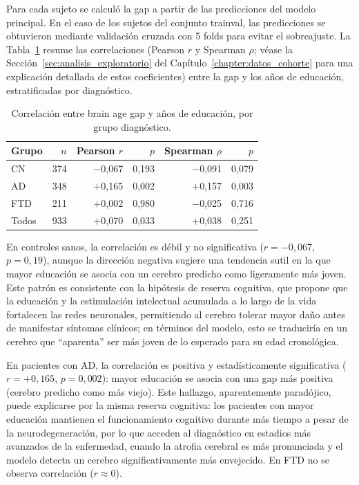 Para cada sujeto se calculó la gap a partir de las predicciones del modelo principal. En el caso de los sujetos del conjunto trainval, las predicciones se obtuvieron mediante validación cruzada con 5 folds para evitar el sobreajuste. La Tabla~\ref{tab:gap_education} resume las correlaciones (Pearson $r$ y Spearman $\rho$; véase la Sección~\ref{sec:analisis_exploratorio} del Capítulo~\ref{chapter:datos_cohorte} para una explicación detallada de estos coeficientes) entre la gap y los años de educación, estratificadas por diagnóstico.

\begin{table}[H]
\centering
\caption{Correlación entre brain age gap y años de educación, por grupo diagnóstico.}
\label{tab:gap_education}
\begin{tabular}{lrrrrr}
\toprule
\textbf{Grupo} & \textbf{$n$} & \textbf{Pearson $r$} & \textbf{$p$} & \textbf{Spearman $\rho$} & \textbf{$p$} \\
\midrule
CN  & 374 & $-$0,067 & 0,193  & $-$0,091 & 0,079 \\
AD  & 348 & $+$0,165 & 0,002  & $+$0,157 & 0,003 \\
FTD & 211 & $+$0,002 & 0,980  & $-$0,025 & 0,716 \\
Todos & 933 & $+$0,070 & 0,033  & $+$0,038 & 0,251 \\
\bottomrule
\end{tabular}
\end{table}

En controles sanos, la correlación es débil y no significativa ($r = -0{,}067$, $p = 0{,}19$), aunque la dirección negativa sugiere una tendencia sutil en la que mayor educación se asocia con un cerebro predicho como ligeramente más joven. Este patrón es consistente con la hipótesis de reserva cognitiva, que propone que la educación y la estimulación intelectual acumulada a lo largo de la vida fortalecen las redes neuronales, permitiendo al cerebro tolerar mayor daño antes de manifestar síntomas clínicos; en términos del modelo, esto se traduciría en un cerebro que ``aparenta'' ser más joven de lo esperado para su edad cronológica.

En pacientes con AD, la correlación es positiva y estadísticamente significativa ($r = +0{,}165$, $p = 0{,}002$): mayor educación se asocia con una gap más positiva (cerebro predicho como más viejo). Este hallazgo, aparentemente paradójico, puede explicarse por la misma reserva cognitiva: los pacientes con mayor educación mantienen el funcionamiento cognitivo durante más tiempo a pesar de la neurodegeneración, por lo que acceden al diagnóstico en estadios más avanzados de la enfermedad, cuando la atrofia cerebral es más pronunciada y el modelo detecta un cerebro significativamente más envejecido. En FTD no se observa correlación ($r \approx 0$).

